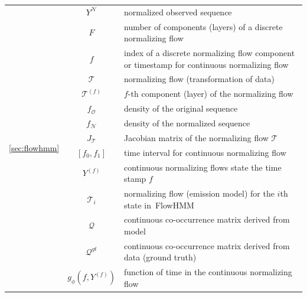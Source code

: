 \documentclass[shortabstract]{iithesis}
\begin{document}
\begin{table}[!ht]
\begin{tabular}{ |c|c|p{9.5cm}| }
 \multirow{14}{*}{\ref{sec:flowhmm}}
    & $Y^{\mathcal N}$ & normalized observed sequence \\
    & $F$ & number of components (layers) of a discrete normalizing flow \\
    & $f$ & index of a discrete normalizing flow component \linebreak or timestamp for continuous normalizing flow \\
    & $\mathcal{T}$ & normalizing flow (transformation of data) \\
    & $\mathcal{T}^{(f)}$ & $f$-th component (layer) of the normalizing flow \\
    & $f_{\mathcal O}$ & density of the original sequence \\
    & $f_{\mathcal N}$ & density of the normalized sequence \\
    & $J_{\mathcal{T}}$ & Jacobian matrix of the normalizing flow $\mathcal{T}$ \\
    & $[f_0, f_1]$ & time interval for continuous normalizing flow \\
    & $Y^{(f)}$ & continuous normalizing flows state the time stamp $f$ \\ 
    & $\mathcal{T}_i$ & normalizing flow (emission model) for the $i$th state in~FlowHMM \\
    & $\mathcal Q$ & continuous co-occurrence matrix derived from model \\
    & $\mathcal Q^{gt}$ & continuous co-occurrence matrix derived from data (ground truth) \\ 
    & $g_{\phi}(f, Y^{(f)})$ & function of time in the continuous normalizing flow \\    \hline
    \end{tabular}
\end{table}
\end{document}
